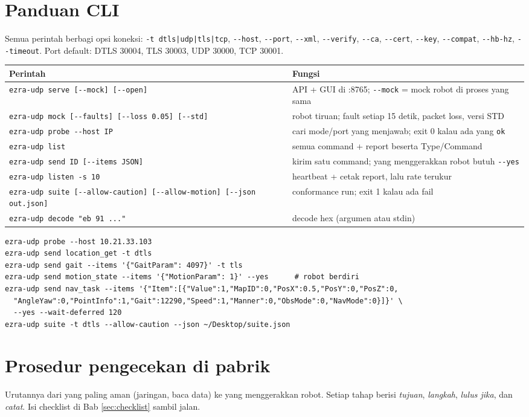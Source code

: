 \documentclass[11pt,a4paper]{article}
\newcommand{\code}[1]{\texttt{#1}}
\begin{document}
\section{Panduan CLI}\label{sec:cli}
Semua perintah berbagi opsi koneksi: \code{-t dtls|udp|tls|tcp}, \code{-{}-host}, \code{-{}-port},
\code{-{}-xml}, \code{-{}-verify}, \code{-{}-ca}, \code{-{}-cert}, \code{-{}-key}, \code{-{}-compat}, \code{-{}-hb-hz},
\code{-{}-timeout}. Port default: DTLS 30004, TLS 30003, UDP 30000, TCP 30001.
\begin{xltabular}{\linewidth}{@{}L{60mm}Y@{}}
\toprule
\textbf{Perintah} & \textbf{Fungsi}\\\midrule
\endhead
\code{ezra-udp serve [-{}-mock] [-{}-open]} & API + GUI di :8765; \code{-{}-mock} = mock robot di proses yang sama\\
\code{ezra-udp mock [-{}-faults] [-{}-loss 0.05] [-{}-std]} & robot tiruan; fault setiap 15 detik, packet loss, versi STD\\
\code{ezra-udp probe -{}-host IP} & cari mode/port yang menjawab; exit 0 kalau ada yang \code{ok}\\
\code{ezra-udp list} & semua command + report beserta Type/Command\\
\code{ezra-udp send ID [-{}-items JSON]} & kirim satu command; yang menggerakkan robot butuh \code{-{}-yes}\\
\code{ezra-udp listen -s 10} & heartbeat + cetak report, lalu rate terukur\\
\code{ezra-udp suite [-{}-allow-caution] [-{}-allow-motion] [-{}-json out.json]} & conformance run; exit 1 kalau ada fail\\
\code{ezra-udp decode "eb 91 ..."} & decode hex (argumen atau stdin)\\
\bottomrule
\end{xltabular}
\begin{lstlisting}
ezra-udp probe --host 10.21.33.103
ezra-udp send location_get -t dtls
ezra-udp send gait --items '{"GaitParam": 4097}' -t tls
ezra-udp send motion_state --items '{"MotionParam": 1}' --yes      # robot berdiri
ezra-udp send nav_task --items '{"Item":[{"Value":1,"MapID":0,"PosX":0.5,"PosY":0,"PosZ":0,
  "AngleYaw":0,"PointInfo":1,"Gait":12290,"Speed":1,"Manner":0,"ObsMode":0,"NavMode":0}]}' \
  --yes --wait-deferred 120
ezra-udp suite -t dtls --allow-caution --json ~/Desktop/suite.json
\end{lstlisting}

\section{Prosedur pengecekan di pabrik}\label{sec:field}
Urutannya dari yang paling aman (jaringan, baca data) ke yang menggerakkan robot. Setiap tahap berisi
\emph{tujuan}, \emph{langkah}, \emph{lulus jika}, dan \emph{catat}. Isi checklist di Bab \ref{sec:checklist} sambil jalan.
\end{document}
